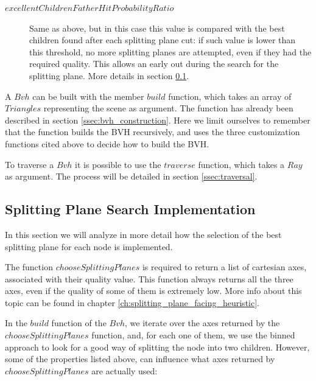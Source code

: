 \documentclass{PoliMi_MasterThesis}
\begin{document}
\begin{description}
	\item[\boldmath$excellentChildrenFatherHitProbabilityRatio$] Same as above, but in this case this value is compared with the best children found after each splitting plane cut: if such value is lower than this threshold, no more splitting planes are attempted, even if they had the required quality. This allows an early out during the search for the splitting plane. More details in section \ref{ssec:splitting_plane_implementation}.
\end{description}
	
A $Bvh$ can be built with the member $build$ function, which takes an array of $Triangles$ representing the scene as argument. The function has already been described in section \ref{ssec:bvh_construction}. Here we limit ourselves to remember that the function builds the BVH recursively, and uses the three customization functions cited above to decide how to build the BVH.

To traverse a $Bvh$ it is possible to use the $traverse$ function, which takes a $Ray$ as argument. The process will be detailed in section \ref{ssec:traversal}.


\subsection{Splitting Plane Search Implementation} \label{ssec:splitting_plane_implementation}
In this section we will analyze in more detail how the selection of the best splitting plane for each node is implemented.

The function $chooseSplittingPlanes$ is required to return a list of cartesian axes, associated with their quality value. This function always returns all the three axes, even if the quality of some of them is extremely low. More info about this topic can be found in chapter \ref{ch:splitting_plane_facing_heuristic}.

In the $build$ function of the $Bvh$, we iterate over the axes returned by the $chooseSplittingPlanes$ function, and, for each one of them, we use the binned approach to look for a good way of splitting the node into two children. However, some of the properties listed above, can influence what axes returned by $chooseSplittingPlanes$ are actually used:
\end{document}
